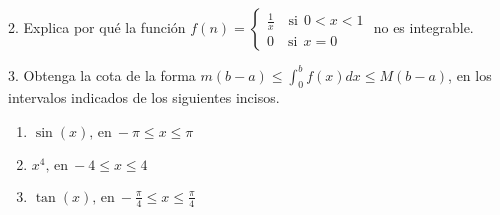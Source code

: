 \documentclass[12pt]{article}
\begin{document}
2. Explica por qu\'e la funci\'on
\(f(n)=
\begin{cases}
    \displaystyle\frac{1}{x} \quad \text{si} \ \ 0<x<1\\
    0 \quad \text{si} \ \ x=0
\end{cases}
\) no es integrable.

3. Obtenga la cota de la forma \(m(b-a) \leq \displaystyle\int_{0}^{b}f(x)dx \leq M(b-a)\), en los intervalos indicados de los siguientes incisos.

\begin{enumerate}[\hspace{9px} a)]
    \item \(\sin(x) \text{, en} \ -\pi \leq x \leq \pi\)

    \item \(x^4 \text{, en} \ -4 \leq x \leq 4\)

    \item \(\tan(x) \text{, en} \ -\displaystyle\frac{\pi}{4} \leq x \leq \frac{\pi}{4}\)

\end{enumerate}
\end{document}
